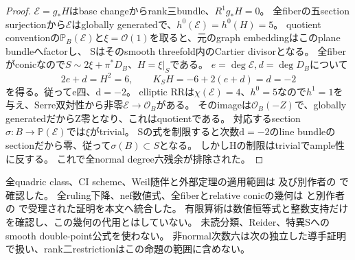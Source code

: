 \documentclass[a4paper,11pt]{ltjsarticle}
\theoremstyle{definition}
\begin{document}
\begin{proof}
$\mathcal E=g_*H$はbase changeからrank三bundle、$R^1g_*H=0$。
全fiberの五section surjectionから$\mathcal E$はglobally generatedで、$h^0(\mathcal E)=h^0(H)=5$。
quotient conventionの$\mathbb P_B(\mathcal E)$と$\xi=\mathcal O(1)$を取ると、元のgraph embeddingはこのplane bundleへfactorし、
Sはそのsmooth threefold内のCartier divisorとなる。
全fiberがconicなので$S\sim2\xi+\pi^*D_B$、$H=\xi|_S$である。
$e=\deg\mathcal E,d=\deg D_B$について
\[
 2e+d=H^2=6,\qquad
 K_SH=-6+2(e+d)=d=-2
\]
を得る。従ってe四、d$=-2$。
elliptic RRは$\chi(\mathcal E)=4$、$h^0=5$なので$h^1=1$を与え、Serre双対性から非零$\mathcal E\to\mathcal O_B$がある。
そのimageは$\mathcal O_B(-Z)$で、globally generatedだからZ零となり、これはquotientである。
対応するsection$\sigma:B\to\mathbb P(\mathcal E)$では$\xi$がtrivial。
Sの式を制限すると次数d$=-2$のline bundleのsectionだから零、従って$\sigma(B)\subset S$となる。
しかしHの制限はtrivialでample性に反する。
これで全normal degree六残余が排除された。
\end{proof}
全quadric class、CI scheme、Weil随伴と外部定理の適用範囲は
及び別作者の
で確認した。
全ruling下降、nef数値式、全fiberとrelative conicの幾何は
と別作者の
で受理された証明を本文へ統合した。
有限算術は数値恒等式と整数支持だけを確認し、この幾何の代用とはしていない。
未読分類、Reider、特異Sへのsmooth double-point公式を使わない。
非normal次数六は次の独立した導手証明で扱い、rank二restrictionはこの命題の範囲に含めない。
\end{document}
